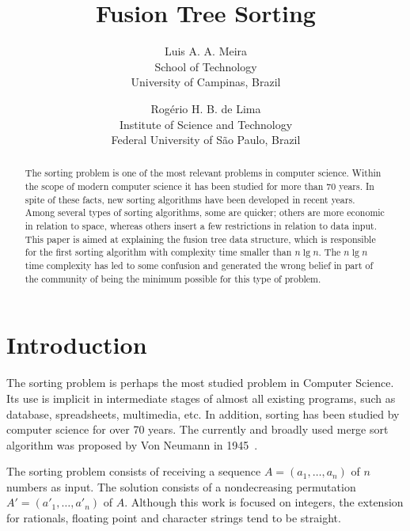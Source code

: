 \documentclass[11pt]{article}
\begin{document}
\title{Fusion Tree Sorting}




\author{Luis A. A. Meira \\ \small School of Technology  \\ \small University of Campinas, Brazil \and Rogério H. B. de Lima \\ \small Institute of Science and Technology \\ \small Federal University of S\~{a}o  Paulo, Brazil }

\maketitle




\begin{abstract}
 The sorting problem is one of the most relevant problems in computer science. Within the scope of modern computer science it has been studied for more than 70 years. In spite of these facts, new sorting algorithms have been developed in recent years. Among several types of sorting algorithms, some are quicker; others are more economic in relation to space, whereas others insert a few restrictions in relation to data input. This paper is aimed at explaining the fusion tree data structure, which is responsible for the first sorting algorithm with complexity time smaller than $n\lg n$. The $n\lg n$ time complexity has led to some confusion and generated the wrong belief in part of the community of being the minimum possible for this type of problem.
\end{abstract}

\section{Introduction}



The sorting problem is perhaps the most studied problem in Computer Science. Its use is implicit in intermediate stages of almost all existing programs, such as database, spreadsheets, multimedia, etc. In addition, sorting has been studied by computer science for over 70 years. The currently and broadly used merge sort algorithm was proposed by Von Neumann in 1945~\cite{cormen}.
 
 The sorting problem consists of receiving a sequence $A= (a_1, \ldots , a_n)$ of $n$ numbers as input. The solution consists of a nondecreasing permutation  $A'= (a'_1, \ldots ,a'_n)$ of $A$. Although this work is focused on integers, the extension for rationals, floating point and character strings tend to be straight.
 
\end{document}
